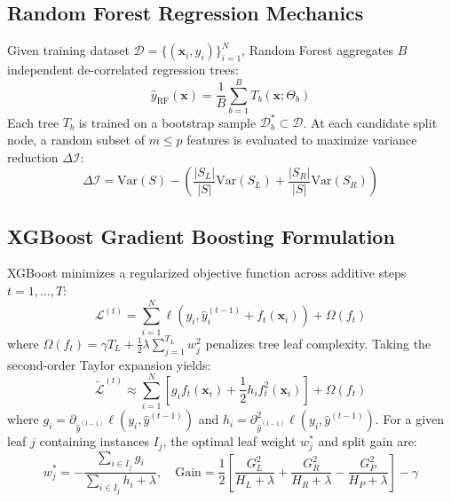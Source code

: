 \documentclass[conference]{IEEEtran}
\begin{document}
\subsection{Random Forest Regression Mechanics}
Given training dataset $\mathcal{D} = \{(\mathbf{x}_i, y_i)\}_{i=1}^N$, Random Forest aggregates $B$ independent de-correlated regression trees:
\begin{equation}
\hat{y}_{\text{RF}}(\mathbf{x}) = \frac{1}{B} \sum_{b=1}^B T_b(\mathbf{x}; \Theta_b)
\end{equation}
Each tree $T_b$ is trained on a bootstrap sample $\mathcal{D}_b^* \subset \mathcal{D}$. At each candidate split node, a random subset of $m \le p$ features is evaluated to maximize variance reduction $\Delta \mathcal{I}$:
\begin{equation}
\Delta \mathcal{I} = \text{Var}(S) - \left( \frac{|S_L|}{|S|}\text{Var}(S_L) + \frac{|S_R|}{|S|}\text{Var}(S_R) \right)
\end{equation}

\subsection{XGBoost Gradient Boosting Formulation}
XGBoost minimizes a regularized objective function across additive steps $t = 1, \dots, T$:
\begin{equation}
\mathcal{L}^{(t)} = \sum_{i=1}^N \ell\left(y_i, \hat{y}_i^{(t-1)} + f_t(\mathbf{x}_i)\right) + \Omega(f_t)
\end{equation}
where $\Omega(f_t) = \gamma T_L + \frac{1}{2}\lambda \sum_{j=1}^{T_L} w_j^2$ penalizes tree leaf complexity. Taking the second-order Taylor expansion yields:
\begin{equation}
\tilde{\mathcal{L}}^{(t)} \approx \sum_{i=1}^N \left[ g_i f_t(\mathbf{x}_i) + \frac{1}{2} h_i f_t^2(\mathbf{x}_i) \right] + \Omega(f_t)
\end{equation}
where $g_i = \partial_{\hat{y}^{(t-1)}} \ell(y_i, \hat{y}^{(t-1)})$ and $h_i = \partial_{\hat{y}^{(t-1)}}^2 \ell(y_i, \hat{y}^{(t-1)})$. For a given leaf $j$ containing instances $I_j$, the optimal leaf weight $w_j^*$ and split gain are:
\begin{equation}
w_j^* = -\frac{\sum_{i \in I_j} g_i}{\sum_{i \in I_j} h_i + \lambda}, \quad \text{Gain} = \frac{1}{2} \left[ \frac{G_L^2}{H_L + \lambda} + \frac{G_R^2}{H_R + \lambda} - \frac{G_P^2}{H_P + \lambda} \right] - \gamma
\end{equation}
\end{document}

